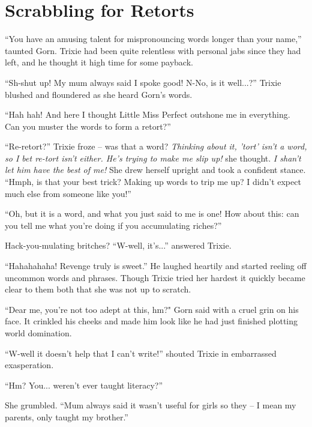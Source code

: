 \scenesep

\section{Scrabbling for Retorts}

``You have an amusing talent for mispronouncing words longer than your name,''
taunted Gorn. Trixie had been quite relentless with personal jabs since they had
left, and he thought it high time for some payback.

``Sh-shut up! My mum always said I spoke good! N-No, is it well...?'' Trixie
blushed and floundered as she heard Gorn's words.

``Hah hah! And here I thought Little Miss Perfect outshone me in everything.
Can you muster the words to form a retort?''

``Re-retort?'' Trixie froze -- was that a word? \textit{Thinking about it,
'tort' isn't a word, so I bet re-tort isn't either. He's trying to make me slip
up!} she thought. \textit{I shan't let him have the best of me!} She drew
herself upright and took a confident stance. ``Hmph, is that your best trick?
Making up words to trip me up? I didn't expect much else from someone like
you!''

``Oh, but it is a word, and what you just said to me is one! How about this: can
you tell me what you're doing if you accumulating riches?''

Hack-you-mulating britches? ``W-well, it's...'' answered Trixie.

``Hahahahaha! Revenge truly is sweet.'' He laughed heartily and started reeling
off uncommon words and phrases. Though Trixie tried her hardest it quickly
became clear to them both that she was not up to scratch.

``Dear me, you're not too adept at this, hm?" Gorn said with a cruel grin on his
face. It crinkled his cheeks and made him look like he had just finished
plotting world domination.

``W-well it doesn't help that I can't write!'' shouted Trixie in embarrassed
exasperation.

``Hm? You... weren't ever taught literacy?''

She grumbled. ``Mum always said it wasn't useful for girls so they -- I mean my
parents, only taught my brother.''
